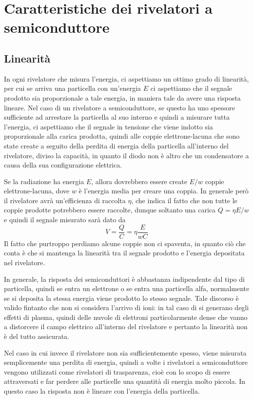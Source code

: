 \section{Caratteristiche dei rivelatori a semiconduttore}

\subsection{Linearità}
In ogni rivelatore che misura l'energia, ci aspettiamo un ottimo grado di linearità, per cui se arriva una particella con un'energia $E$ ci aspettiamo che il segnale prodotto sia proporzionale a tale energia, in maniera tale da avere una risposta lineare. Nel caso di un rivelatore a semiconduttore, se questo ha uno spessore sufficiente ad arrestare la particella al suo interno e quindi a misurare tutta l'energia, ci aspettiamo che il segnale in tensione che viene indotto sia proporzionale alla carica prodotta, quindi alle coppie elettrone-lacuna che sono state create a seguito della perdita di energia della particella all'interno del rivelatore, diviso la capacità, in quanto il diodo non è altro che un condensatore a causa della sua configurazione elettrica.

Se la radiazione ha energia $E$, allora dovrebbero essere create $E/w$ coppie elettrone-lacuna, dove $w$ è l'energia media per creare una coppia. In generale però il rivelatore avrà un'efficienza di raccolta $\eta$, che indica il fatto che non tutte le coppie prodotte potrebbero essere raccolte, dunque soltanto una carica $Q=\eta E/w$ e quindi il segnale misurato sarà dato da
\begin{equation*}
   V
   =\frac{Q}{C}
   =\eta \frac{E}{w C}
\end{equation*}
Il fatto che purtroppo perdiamo alcune coppie non ci spaventa, in quanto ciò che conta è che si mantenga la linearità tra il segnale prodotto e l'energia depositata nel rivelatore.

In generale, la risposta dei semiconduttori è abbastanza indipendente dal tipo di particella, quindi se entra un elettrone o se entra una particella alfa, normalmente se si deposita la stessa energia viene prodotto lo stesso segnale. Tale discorso è valido fintanto che non si considera l'arrivo di ioni: in tal caso di si generano degli effetti di plasma, quindi delle nuvole di elettroni particolarmente dense che vanno a distorcere il campo elettrico all'interno del rivelatore e pertanto la linearità non è del tutto assicurata.

Nel caso in cui invece il rivelatore non sia sufficientemente spesso, viene misurata semplicemente una perdita di energia, quindi a volte i rivelatori a semiconduttore vengono utilizzati come rivelatori di trasparenza, cioè con lo scopo di essere attraversati e far perdere alle particelle una quantità di energia molto piccola. In questo caso la risposta non è lineare con l'energia della particella.

